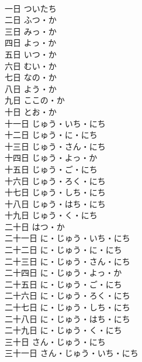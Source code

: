 \documentclass[8pt]{extreport}
\begin{document}
\begin{CJK}{UTF8}{min}
\\	一日	ついたち
\\	二日	ふつ・か
\\	三日	みっ・か
\\	四日	よっ・か
\\	五日	いつ・か
\\	六日	むい・か
\\	七日	なの・か
\\	八日	よう・か
\\	九日	ここの・か
\\	十日	とお・か
\\	十一日	じゅう・いち・にち
\\	十二日	じゅう・に・にち
\\	十三日	じゅう・さん・にち
\\	十四日	じゅう・よっ・か
\\	十五日	じゅう・ご・にち
\\	十六日	じゅう・ろく・にち
\\	十七日	じゅう・しち・にち
\\	十八日	じゅう・はち・にち
\\	十九日	じゅう・く・にち
\\	二十日	はつ・か
\\	二十一日	に・じゅう・いち・にち
\\	二十二日	に・じゅう・に・にち
\\	二十三日	に・じゅう・さん・にち
\\	二十四日	に・じゅう・よっ・か
\\	二十五日	に・じゅう・ご・にち
\\	二十六日	に・じゅう・ろく・にち
\\	二十七日	に・じゅう・しち・にち
\\	二十八日	に・じゅう・はち・にち
\\	二十九日	に・じゅう・く・にち
\\	三十日	さん・じゅう・にち
\\	三十一日	さん・じゅう・いち・にち
\end{CJK}
\end{document}
